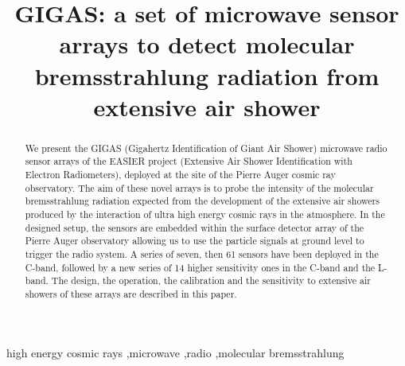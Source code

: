 \documentclass[preprint,number,sort&compress,longtitle]{elsarticle}   %
\begin{document}

\begin{frontmatter}


\title{GIGAS: a  set of microwave sensor  arrays to detect  molecular bremsstrahlung  radiation from extensive air shower}




\begin{abstract}
  \noindent

We present  the GIGAS (Gigahertz  Identification of Giant  Air Shower)
microwave  radio sensor arrays  of the  EASIER project  (Extensive Air
Shower Identification with Electron Radiometers), deployed at the site
of the  Pierre Auger cosmic ray  observatory.  The aim  of these novel
arrays  is to  probe  the intensity  of  the molecular  bremsstrahlung
radiation expected  from the development of the  extensive air showers
produced by  the interaction of ultra  high energy cosmic  rays in the
atmosphere.  In  the designed setup,  the sensors are  embedded within
the surface detector array of the Pierre Auger observatory allowing us
to  use the  particle signals  at ground  level to  trigger  the radio
system.  A series of seven, then  61 sensors have been deployed in the
C-band, followed by a new series  of 14 higher sensitivity ones in the
C-band and the L-band.  The design, the operation, the calibration and
the sensitivity to extensive air showers of these arrays are described
in this paper.
\end{abstract}
\begin{keyword}
high energy cosmic rays \sep microwave \sep radio
\sep molecular bremsstrahlung  
\end{keyword}
\end{frontmatter}
\setcounter{footnote}{0}








\end{document}

